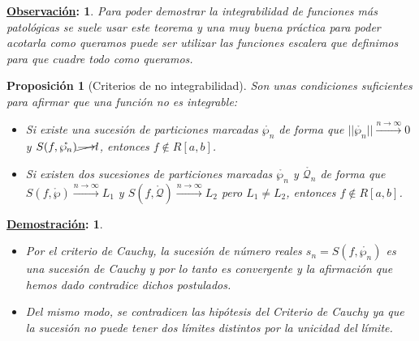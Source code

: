 \documentclass[10pt,a4paper,openright]{book}
\theoremstyle{break}
\newtheorem*{prop}{Proposición}
\newtheorem*{demo}{\underline{Demostración}:}
\newtheorem*{obs}{\underline{Observación}:}
\begin{document}
\begin{obs}
Para poder demostrar la integrabilidad de funciones más patológicas se suele usar este teorema y una muy buena práctica para poder acotarla como queramos puede ser utilizar las funciones escalera que definimos para que cuadre todo como queramos.
\end{obs}

\begin{prop}[Criterios de no integrabilidad]
Son unas condiciones suficientes para afirmar que una función no es integrable:
\begin{itemize}
\item Si existe una sucesión de particiones marcadas $\mathring{\wp_n}$ de forma que $||\mathring{\wp_n}||\xrightarrow{n\rightarrow \infty} 0 $ y $S(f,\mathring{\wp_n})\cancel{\longrightarrow} l$, entonces $f\notin R[a,b]$.

\item Si existen dos sucesiones de particiones marcadas $\mathring{\wp_n}$ y $\mathring{\mathcal{Q}_n}$ de forma que $S(f,\mathring{\wp})\xrightarrow{n\rightarrow \infty} L_1$ y $S(f,\mathring{\mathcal{Q}})\xrightarrow{n\rightarrow \infty} L_2$ pero $L_1\neq L_2$, entonces $f\notin R[a,b]$.
\end{itemize}
\end{prop}
\begin{demo}
\begin{itemize}
\item Por el criterio de Cauchy, la sucesión de número reales $s_n = S(f,\mathring{\wp_n})$ es una sucesión de Cauchy y por lo tanto es convergente y la afirmación que hemos dado contradice dichos postulados.
\item Del mismo modo, se contradicen las hipótesis del Criterio de Cauchy ya que la sucesión no puede tener dos límites distintos por la unicidad del límite.
\end{itemize}
\end{demo}
\end{document}
